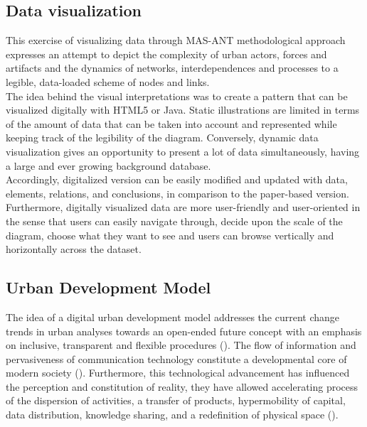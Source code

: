\documentclass[11pt]{report}
\begin{document}
{{{\subsection{Data visualization}

This exercise of visualizing data through MAS-ANT methodological approach expresses an attempt to depict the complexity of urban actors, forces and artifacts and the dynamics of networks, interdependences and processes to a legible, data-loaded scheme of nodes and links. 
\\

The idea behind the visual interpretations was to create a pattern that can be visualized digitally with HTML5 or Java.
Static illustrations are limited in terms of the amount of data that can be taken into account and represented while keeping track of the legibility of the diagram.
Conversely, dynamic data visualization gives an opportunity to present a lot of data simultaneously, having a large and ever growing background database. 
\\

Accordingly, digitalized version can be easily modified and updated with data, elements, relations, and conclusions, in comparison to the paper-based version.
Furthermore, digitally visualized data are more user-friendly and user-oriented in the sense that users can easily navigate through, decide upon the scale of the diagram, choose what they want to see and users can browse vertically and horizontally across the dataset.

\subsection{Urban Development Model}

The idea of a digital urban development model addresses the current change trends in urban analyses towards an open-ended future concept with an emphasis on inclusive, transparent and flexible procedures (\href{Rode}{\citealt{rode_city_2006}}).
The flow of information and pervasiveness of communication technology constitute a developmental core of modern society (\href{ref}{\citealt{sassen_cities_2012}}).
Furthermore, this technological advancement has influenced the perception and constitution of reality, they have allowed accelerating process of the dispersion of activities, a transfer of products, hypermobility of capital, data distribution, knowledge sharing, and a redefinition of physical space (\href{ref}{\citealt{firmino_pervasive_2008}}). 
\\

}}}
\end{document}
